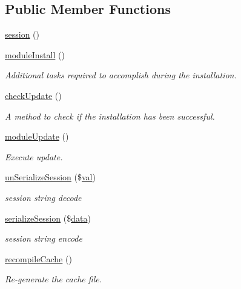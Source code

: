 \subsection*{Public Member Functions}
\begin{DoxyCompactItemize}
\item 
\hyperlink{classsession_a96fce5e6e2f2f0504cb1b9b4906ba379}{session} ()
\item 
\hyperlink{classsession_af6b13ec50160d63aca04f689e5cac9dd}{module\+Install} ()
\begin{DoxyCompactList}\small\item\em Additional tasks required to accomplish during the installation. \end{DoxyCompactList}\item 
\hyperlink{classsession_a30f6cc95b00bd35757aa882abce7ac34}{check\+Update} ()
\begin{DoxyCompactList}\small\item\em A method to check if the installation has been successful. \end{DoxyCompactList}\item 
\hyperlink{classsession_ad1eb77a85d7765620658071e49d16cff}{module\+Update} ()
\begin{DoxyCompactList}\small\item\em Execute update. \end{DoxyCompactList}\item 
\hyperlink{classsession_a97462709868f87d6cb050956c7b7da6d}{un\+Serialize\+Session} (\$\hyperlink{ckeditor_2js_2xe__interface_8js_a4fb96abdf073a439bca5e051c333b35d}{val})
\begin{DoxyCompactList}\small\item\em session string decode \end{DoxyCompactList}\item 
\hyperlink{classsession_aea7dba13f8bc60c916840c66b2bc28ba}{serialize\+Session} (\$\hyperlink{document__category_8js_a94b4f25375ac17cb917012e05bf514a7}{data})
\begin{DoxyCompactList}\small\item\em session string encode \end{DoxyCompactList}\item 
\hyperlink{classsession_a08f5190f8867dc2c0d5c23435b236f15}{recompile\+Cache} ()
\begin{DoxyCompactList}\small\item\em Re-\/generate the cache file. \end{DoxyCompactList}\end{DoxyCompactItemize}
